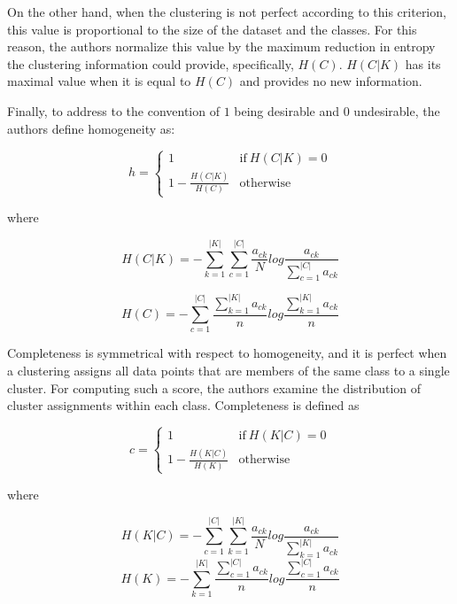 On the other hand, when the clustering is not perfect according to this criterion, this value is proportional to the size of the dataset and the classes.
For this reason, the authors normalize this value by the maximum reduction in entropy the clustering information could provide, specifically, $H(C)$.
$H(C|K)$ has its maximal value when it is equal to $H(C)$ and provides no new information.

Finally, to address to the convention of $1$ being desirable and $0$ undesirable, the authors define homogeneity as:

\begin{equation}
\label{equation:homo}
    h = \begin{cases} 1 & \text{if}\ H(C|K) = 0 \\1-\frac{H(C|K)}{H(C)} & \text{otherwise}\end{cases}
\end{equation}

where

\begin{equation}
    H(C|K) =  -\sum_{k=1}^{|K|}{\sum_{c=1}^{|C|}{\frac{a_{ck}}{N}log\frac{a_{ck}}{\sum_{c=1}^{|C|}{a_{ck}}}}}
\end{equation}

\vspace{1em}

\begin{equation}
    H(C) = -\sum_{c=1}^{|C|}{  \frac{\sum_{k=1}^{|K|}a_{ck}}{n}log \frac{\sum_{k=1}^{|K|}a_{ck}}{n} }
\end{equation}
\vspace{1em}

Completeness is symmetrical with respect to homogeneity, and it is perfect when a clustering assigns all data points that are members of the same class to a single cluster. 
For computing such a score, the authors examine the distribution of cluster assignments within each class.
Completeness is defined as 

\begin{equation}
\label{equation:completeness}
    c = \begin{cases} 1 & \text{if}\ H(K|C) = 0 \\1-\frac{H(K|C)}{H(K)} & \text{otherwise}\end{cases}
\end{equation}

where

\begin{equation}
    H(K|C) =  -\sum_{c=1}^{|C|}{\sum_{k=1}^{|K|}{\frac{a_{ck}}{N}log\frac{a_{ck}}{\sum_{k=1}^{|K|}{a_{ck}}}}}
\end{equation}
\vspace{2em}
\begin{equation}
    H(K) = -\sum_{k=1}^{|K|}{  \frac{\sum_{c=1}^{|C|}a_{ck}}{n}log \frac{\sum_{c=1}^{|C|}a_{ck}}{n} }
\end{equation}
\vspace{1em}

